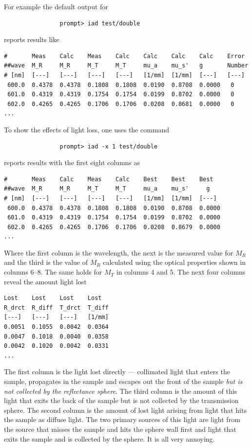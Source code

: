 \documentclass{article}
\begin{document}
For example the default output for
\begin{verbatim}
                prompt> iad test/double
\end{verbatim}
reports results like
\begin{verbatim}
#       Meas    Calc    Meas    Calc    Calc    Calc    Calc    Error
##wave  M_R     M_R     M_T     M_T     mu_a    mu_s'   g       Number
# [nm]  [---]   [---]   [---]   [---]   [1/mm]  [1/mm]  [---]   [---]
 600.0  0.4378  0.4378  0.1808  0.1808  0.0190  0.8708  0.0000   0
 601.0  0.4319  0.4319  0.1754  0.1754  0.0199  0.8702  0.0000   0
 602.0  0.4265  0.4265  0.1706  0.1706  0.0208  0.8681  0.0000   0
...
\end{verbatim}
To show the effects of light loss, one uses the command
\begin{verbatim}
                prompt> iad -x 1 test/double
\end{verbatim}
reports results with the first eight columns as
\begin{verbatim}
#       Meas    Calc    Meas    Calc    Best    Best    Best   
##wave  M_R     M_R     M_T     M_T     mu_a    mu_s'     g    
# [nm]  [---]   [---]   [---]   [---]   [1/mm]  [1/mm]  [---]  
 600.0  0.4378  0.4378  0.1808  0.1808  0.0190  0.8708  0.0000 
 601.0  0.4319  0.4319  0.1754  0.1754  0.0199  0.8702  0.0000 
 602.0  0.4265  0.4265  0.1706  0.1706  0.0208  0.8679  0.0000 
...
\end{verbatim}
Where the first column is the wavelength, the next is the measured
value for $M_R$ and the third is the value of $M_R$ calculated using
the optical properties shown in columns 6--8.  The same holds for
$M_T$ in columns 4 and 5.  The next four columns reveal the amount
light lost
\begin{verbatim}
Lost    Lost    Lost    Lost    
R_drct  R_diff  T_drct  T_diff  
[---]   [---]   [---]   [1/mm] 
0.0051  0.1055  0.0042  0.0364  
0.0047  0.1018  0.0040  0.0358  
0.0042  0.1020  0.0042  0.0331  
...
\end{verbatim}
The first column is the light lost directly --- collimated light that enters
the sample, propagates in the sample and escapes out the front of the sample
\textit{but is not collected by the reflectance sphere}.  The third column is
the amount of this light that exits the back of the sample but is not collected
by the transmission sphere.  The second column is the amount of lost light arising
from light that hits the sample as diffuse light.  The two primary sources of this
light are light from the source that misses the sample and hits the sphere wall 
first and light that exits the sample and is collected by the sphere.  It is all
very annoying.
\end{document}

